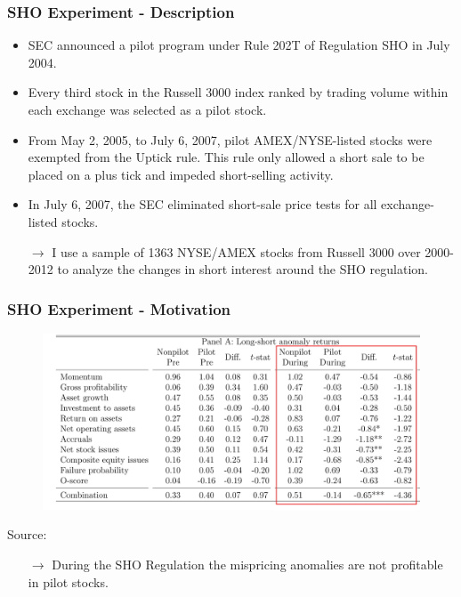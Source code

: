 \documentclass{beamer}
\begin{document}
\begin{frame}

\frametitle{SHO Experiment - Description}
\begin{itemize}
\item SEC announced a pilot program under Rule 202T of Regulation SHO in July 2004.
\item Every third stock in the Russell 3000 index ranked by trading volume within each exchange was selected as a pilot stock.
\item From May 2, 2005, to July 6, 2007, pilot AMEX/NYSE-listed stocks were exempted from the Uptick rule. This rule only allowed a short sale to be placed on a plus tick and impeded short-selling activity.

\item In July 6, 2007, the SEC eliminated short-sale price tests for all exchange-listed stocks.

\item[$\rightarrow$] I use a sample of 1363 NYSE/AMEX stocks from Russell 3000 over 2000-2012  to analyze the changes in short interest around the SHO regulation.

\end{itemize}
\end{frame}
\begin{frame}
	\frametitle{SHO Experiment - Motivation}

\begin{figure}[htbp]
\centering
	\includegraphics[scale=0.65,trim=1 1 1 1,clip]{figures/motivation_sho.jpg} 
	\label{tab:motivation_sho}%
\end{figure}

\vspace*{-1.2 cm}
{\tiny \qquad Source: \citet{Chu2016}}
	\begin{itemize}
		\item[$\rightarrow$] During the SHO Regulation the mispricing anomalies are not profitable in pilot stocks.
	\end{itemize}
\end{frame}  
\end{document}
